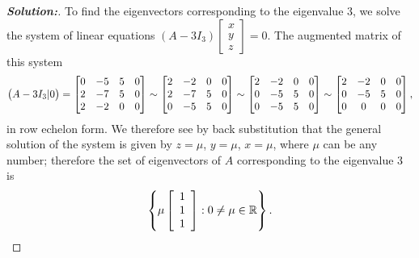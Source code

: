 \documentclass[a4paper]{amsart}
\theoremstyle{definition}
\newenvironment{solution}{\begin{proof}[\textbf{Solution:}] \vphantom{u}}{\end{proof}}
\begin{document}
\begin{solution}
 To find the eigenvectors corresponding to the eigenvalue $3$, we
 solve the system of linear equations $(A - 3I_3)\left[
 \begin{array}{c}x \\ y\\z
 \end{array} \right] = 0$. The augmented matrix of this system
 $$
 \big(A - 3I_3|0\big) = \left[\begin{matrix} 0 & -5 & 5 &0\\
     2 & -7 & 5 &0\\
     2 & -2 & 0&0\end{matrix}\right] \sim
 \left[\begin{matrix} 2 & -2 & 0 &0\\
     2 & -7 & 5 &0\\
     0 & -5 & 5&0\end{matrix}\right] \sim
 \left[\begin{matrix} 2 & -2 & 0 &0\\
     0 & -5 & 5 &0\\
     0 & -5 & 5&0\end{matrix}\right] \sim
 \left[\begin{matrix} 2 & -2 & 0 &0\\
     0 & -5 & 5 &0\\
     0 & 0 & 0&0\end{matrix}\right],
 $$
 in row echelon form. We therefore see by back substitution that
 the general solution of the system is given by $z = \mu$, $y =
 \mu$, $x = \mu$,  where $\mu$ can be any number; therefore the set
 of eigenvectors of $A$ corresponding to the eigenvalue $3$ is
 $$
 \left\{ \mu \left[ \begin{array}{c} 1\\1\\1
 \end{array} \right] : 0 \neq \mu \in {\mathbb{R}} \right\}.
 $$
\end{solution}
\end{document}
